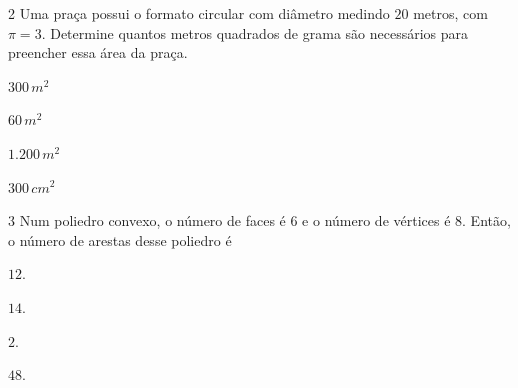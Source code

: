 \num{2}  Uma praça possui o formato circular com diâmetro medindo $20$ metros,
com $\pi = 3$.
Determine quantos metros quadrados de grama são necessários para preencher
essa área da praça.

\begin{multicols}{2}
\begin{escolha}
\item $300\,m^2$
\item $60\,m^2$
\item $1.200\,m^2$
\item $300\,cm^2$
\end{escolha}
\end{multicols}



\num{3}  Num poliedro convexo, o número de faces é $6$ e o número de vértices é
$8$. Então, o número de arestas desse poliedro é

\begin{escolha}
\item $12$.

\item $14$.

\item $2$.

\item $48$.
\end{escolha}


